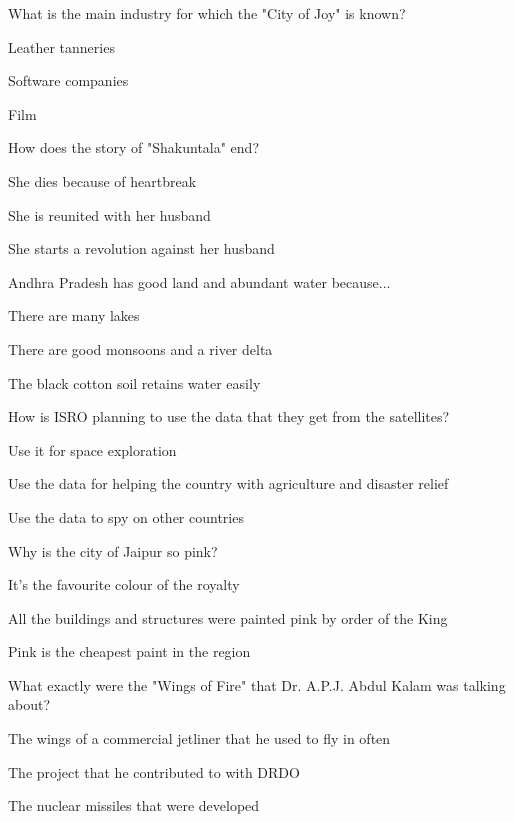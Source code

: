 \begin{enhancedmcq}{What is the main industry for which the "City of Joy" is known?}
\item Leather tanneries
\item Software companies
\item Film

\end{enhancedmcq}
\begin{enhancedmcq}{How does the story of "Shakuntala" end?}
\item She dies because of heartbreak
\item She is reunited with her husband
\item She starts a revolution against her husband

\end{enhancedmcq}
\begin{enhancedmcq}{Andhra Pradesh has good land and abundant water because...}
\item There are many lakes
\item There are good monsoons and a river delta
\item The black cotton soil retains water easily

\end{enhancedmcq}
\begin{enhancedmcq}{How is ISRO planning to use the data that they get from the satellites?}
\item Use it for space exploration
\item Use the data for helping the country with agriculture and disaster relief
\item Use the data to spy on other countries

\end{enhancedmcq}
\begin{enhancedmcq}{Why is the city of Jaipur so pink?}
\item It's the favourite colour of the royalty
\item All the buildings and structures were painted pink by order of the King
\item Pink is the cheapest paint in the region

\end{enhancedmcq}
\begin{enhancedmcq}{What exactly were the "Wings of Fire" that Dr. A.P.J. Abdul Kalam was talking about?}
\item The wings of a commercial jetliner that he used to fly in often
\item The project that he contributed to with DRDO
\item The nuclear missiles that were developed

\end{enhancedmcq}
